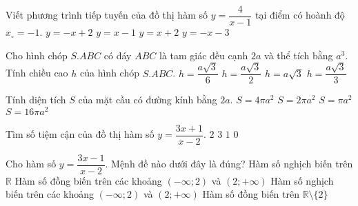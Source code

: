 \begin{ex}%
Viết phương trình tiếp tuyến của đồ thị hàm số $y=\dfrac{4}{x-1}$ tại điểm có hoành độ $x_\circ=-1$.
\choice
{$ y=-x+2 $}
{$ y=x-1 $}
{$ y=x+2 $}
{\True $ y=-x-3 $}
\end{ex}
\begin{ex}%
Cho hình chóp $S.ABC$ có đáy $ABC$ là tam giác đều cạnh $2a$ và thể tích bằng $a^3$. Tính chiều cao $h$ của hình chóp $S.ABC$.
\choice
{$ h=\dfrac{a\sqrt{3}}{6} $}
{$ h=\dfrac{a\sqrt{3}}{2} $}
{\True $ h=a\sqrt{3}$}
{$ h=\dfrac{a\sqrt{3}}{3} $}
\end{ex}
\begin{ex}%
Tính diện tích $S$ của mặt cầu có đường kính bằng $2a$.
\choice
{\True $ S=4\pi a^2 $}
{$ S=2\pi a^2 $}
{$ S=\pi a^2 $}
{$ S=16\pi a^2 $}
\end{ex}
\begin{ex}%
Tìm số tiệm cận của đồ thị hàm số $y=\dfrac{3x+1}{x-2}$.
\choice
{\True $ 2 $}
{$ 3 $}
{$ 1 $}
{$ 0 $}
\end{ex}
\begin{ex}%
Cho hàm số $y=\dfrac{3x-1}{x-2}$. Mệnh đề nào dưới đây là đúng?
\choice
{Hàm số nghịch biến trên $\mathbb{R}$}
{Hàm số đồng biến trên các khoảng $(-\infty;2)$ và $(2;+\infty)$}
{\True Hàm số nghịch biến trên các khoảng $(-\infty;2)$ và $(2;+\infty)$}
{Hàm số đồng biến trên $\mathbb{R}\setminus\{2\}$}
\end{ex}
